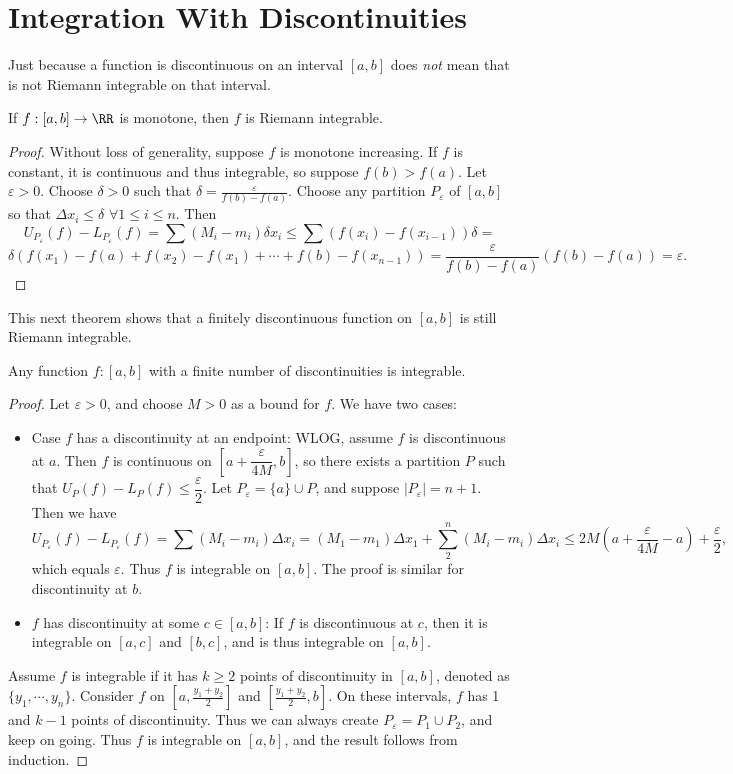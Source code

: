 \section{Integration With Discontinuities}

Just because a function is discontinuous on an interval $[a,b]$ does \emph{not} mean that is not Riemann integrable on that interval. 
\begin{theorem}
If $f: [a,b] \to \RR$ is monotone, then $f$ is Riemann integrable. 
\end{theorem}
\begin{proof}
Without loss of generality, suppose $f$ is monotone increasing. If $f$ is constant, it is continuous and thus integrable, so suppose $f(b) > f(a)$. Let $\varepsilon > 0$. Choose $\delta > 0$ such that $\delta = \frac{\varepsilon}{f(b) - f(a)}$. Choose any partition $P_\varepsilon$ of $[a,b]$ so that $\Delta x_i \leq \delta$ $\forall 1 \leq i \leq n$. Then 
\[ U_{P_\varepsilon}(f) - L_{P_\varepsilon}(f) = \sum (M_i - m_i)\delta x_i \leq \sum (f(x_i) - f(x_{i-1}))\delta = \] \[\delta ( f(x_1) - f(a) + f(x_2) - f(x_1) + \cdots + f(b) - f(x_{n-1})) = \dfrac{\varepsilon}{f(b) - f(a)} (f(b) - f(a)) = \varepsilon.\]
\end{proof}

This next theorem shows that a finitely discontinuous function on $[a,b]$ is still Riemann integrable. 
\begin{theorem}
Any function $f: [a,b]$ with a finite number of discontinuities is integrable. 
\end{theorem}
\begin{proof}
Let $\varepsilon >0$, and choose $M > 0$ as a bound for $f$. We have two cases:
\begin{itemize}
\item Case $f$ has a discontinuity at an endpoint: WLOG, assume $f$ is discontinuous at $a$. Then $f$ is continuous on $[a + \dfrac{\varepsilon}{4M}, b]$, so there exists a partition $P$ such that $U_P(f) - L_P(f) \leq \dfrac{\varepsilon}{2}$. Let $P_\varepsilon = \{a\} \cup P$, and suppose $|P_\varepsilon| = n+1$. Then we have 
\[ U_{P_\varepsilon}(f) - L_{P_\varepsilon}(f) = \sum (M_i - m_i)\Delta x_i = (M_1 - m_1)\Delta x_1 + \sum_2^n (M_i - m_i)\Delta x_i \leq 2M \left (a + \dfrac{\varepsilon}{4M} - a \right ) + \dfrac{\varepsilon}{2}, \] which equals $\varepsilon$. Thus $f$ is integrable on $[a,b]$. The proof is similar for discontinuity at $b$. 
\item $f$ has discontinuity at some $c \in [a,b]$: If $f$ is discontinuous at $c$, then it is integrable on $[a,c]$ and $[b,c]$, and is thus integrable on $[a,b]$.  
\end{itemize}

Assume $f$ is integrable if it has $k \geq 2$ points of discontinuity in $[a,b]$, denoted as $\{y_1, \cdots, y_n\}$. Consider $f$ on $[a, \frac{y_1 + y_2}{2}]$ and $[\frac{y_1 + y_2}{2}, b]$. On these intervals, $f$ has 1 and $k-1$ points of discontinuity. Thus we can always create $P_\varepsilon = P_1 \cup P_2$, and keep on going. Thus $f$ is integrable on $[a,b]$, and the result follows from induction. 
\end{proof}

